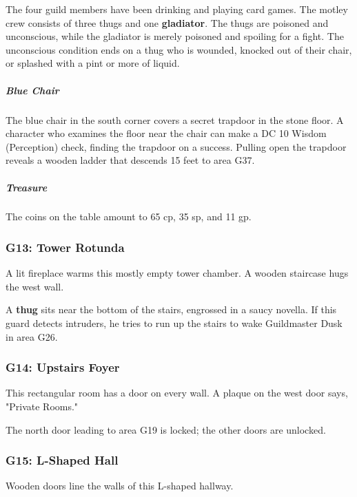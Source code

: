 \documentclass[10pt,a4paper,twoside,bg=print,twocolumn,openany,nodeprecatedcode]{dndbook}
\begin{document}
The four guild members have been drinking and playing card games. The motley crew consists of three thugs and one \textbf{gladiator}. The thugs are poisoned and unconscious, while the gladiator is merely poisoned and spoiling for a fight. The unconscious condition ends on a thug who is wounded, knocked out of their chair, or splashed with a pint or more of liquid.

\subparagraph{Blue Chair}
The blue chair in the south corner covers a secret trapdoor in the stone floor. A character who examines the floor near the chair can make a DC 10 Wisdom (Perception) check, finding the trapdoor on a success. Pulling open the trapdoor reveals a wooden ladder that descends 15 feet to area G37.

\subparagraph{Treasure}
The coins on the table amount to 65 cp, 35 sp, and 11 gp.

\subsubsection{G13: Tower Rotunda}
\begin{DndReadAloud}{}
A lit fireplace warms this mostly empty tower chamber. A wooden staircase hugs the west wall.

\end{DndReadAloud}

A \textbf{thug} sits near the bottom of the stairs, engrossed in a saucy novella. If this guard detects intruders, he tries to run up the stairs to wake Guildmaster Dusk in area G26.

\subsubsection{G14: Upstairs Foyer}
\begin{DndReadAloud}{}
This rectangular room has a door on every wall. A plaque on the west door says, "Private Rooms."

\end{DndReadAloud}

The north door leading to area G19 is locked; the other doors are unlocked.

\subsubsection{G15: L-Shaped Hall}
\begin{DndReadAloud}{}
Wooden doors line the walls of this L-shaped hallway.

\end{DndReadAloud}
\end{document}
